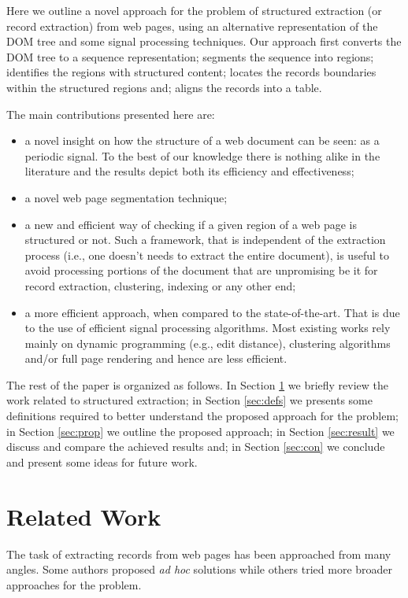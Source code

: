 \documentclass{vldb}
\begin{document}
Here we outline a novel approach for the problem of structured extraction (or
record extraction) from web pages, using an alternative representation of the
DOM tree and some signal processing techniques. Our approach first converts the
DOM tree to a sequence representation; segments the sequence into regions;
identifies the regions with structured content; locates the records boundaries
within the structured regions and; aligns the records into a table.

The main contributions presented here are:
\begin{itemize}
    \item a novel insight on how the structure of a web document can be seen: as
    a periodic signal. To the best of our knowledge there is nothing alike in
    the literature and the results depict both its efficiency and effectiveness;
    \item a novel web page segmentation technique;
    \item a new and efficient way of checking if a given region of a web page is
    structured or not. Such a framework, that is independent of the extraction
    process (i.e., one doesn't needs to extract the entire document), is useful
    to avoid processing portions of the document that are unpromising be it for
    record extraction, clustering, indexing or any other end;
    \item a more efficient approach, when compared to the state-of-the-art.
    That is due to the use of efficient signal processing algorithms. Most existing
    works rely mainly on dynamic programming (e.g., edit distance), clustering
    algorithms and/or full page rendering and hence are less efficient.
\end{itemize}

The rest of the paper is organized as follows. In Section \ref{sec:work} we
briefly review the work related to structured extraction; in Section
\ref{sec:defs} we presents some definitions required to better understand the
proposed approach for the problem; in Section \ref{sec:prop} we outline the
proposed approach; in Section \ref{sec:result} we discuss and compare the
achieved results and; in Section \ref{sec:con} we conclude and present some
ideas for future work.

\section{Related Work}\label{sec:work}

The task of extracting records from web pages has been approached from many
angles. Some authors proposed \textit{ad hoc} solutions while others tried more
broader approaches for the problem.
\end{document}
